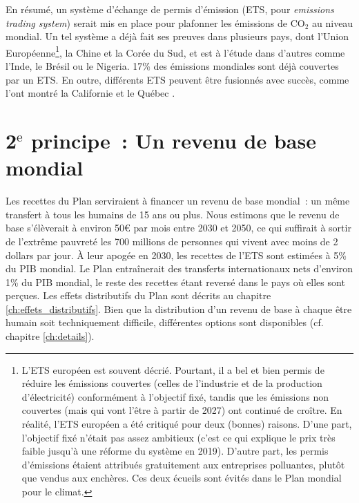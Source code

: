 \documentclass[a5paper,french]{memoir}
\begin{document}
En résumé, un système d'échange de permis d'émission (ETS, pour \textit{emissions trading system}) serait mis en place pour plafonner les émissions de CO$_\text{2}$ au niveau mondial. 
Un tel système a déjà fait ses preuves dans plusieurs pays, dont l'Union Européenne\footnote{L'ETS européen est souvent décrié. Pourtant, il a bel et bien permis de réduire les émissions couvertes (celles de l'industrie et de la production d'électricité) conformément à l'objectif fixé, tandis que les émissions non couvertes (mais qui vont l'être à partir de 2027) ont continué de croître. En réalité, l'ETS européen a été critiqué pour deux (bonnes) raisons. D'une part, l'objectif fixé n'était pas assez ambitieux (c'est ce qui explique le prix très faible jusqu'à une réforme du système en 2019). D'autre part, les permis d'émissions étaient attribués gratuitement aux entreprises polluantes, plutôt que vendus aux enchères. Ces deux écueils sont évités dans le Plan mondial pour le climat.}, la Chine et la Corée du Sud, et est à l'étude dans d'autres comme l'Inde, le Brésil ou le Nigeria. 17\% des émissions mondiales sont déjà couvertes par un ETS. En outre, différents ETS peuvent être fusionnés avec succès, comme l'ont montré la Californie et le Québec \citep{icap_emissions_2023}. 

\section{2$^\text{e}$ principe~: Un revenu de base mondial}

Les recettes du Plan serviraient à financer un revenu de base mondial~: un même transfert à tous les humains de 15 ans ou plus. Nous estimons que le revenu de base s'élèverait à environ 50\euro{} par mois entre 2030 et 2050, %
ce qui suffirait à sortir de l'extrême pauvreté les 700 millions de personnes qui vivent avec moins de 2 dollars par jour. À leur apogée en 2030, les recettes de l'ETS sont estimées à 5\% du PIB mondial. Le Plan entraînerait des transferts internationaux nets d'environ 1\% %
du PIB mondial, le reste des recettes étant reversé dans le pays où elles sont perçues. Les effets distributifs du Plan sont décrits au chapitre \ref{ch:effets_distributifs}. %
Bien que la distribution d'un revenu de base à chaque être humain soit techniquement difficile, différentes options sont disponibles %
 (cf. chapitre \ref{ch:details}).
\end{document}
